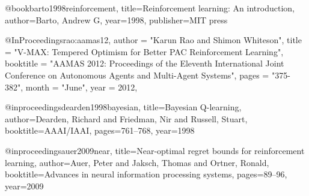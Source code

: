 @book{barto1998reinforcement,
  title={Reinforcement learning: An introduction},
  author={Barto, Andrew G},
  year={1998},
  publisher={MIT press}
}

@InProceedings{rao:aamas12,
  author        = "Karun Rao and Shimon Whiteson",
  title         = "{V-MAX}: Tempered Optimism for Better {PAC} Reinforcement Learning",
  booktitle     = "AAMAS 2012: Proceedings of the Eleventh International
                  Joint Conference on Autonomous Agents and
                  Multi-Agent Systems",
   pages = "375-382",                     
  month = "June",    
  year          = 2012,
}

@inproceedings{dearden1998bayesian,
  title={Bayesian Q-learning},
  author={Dearden, Richard and Friedman, Nir and Russell, Stuart},
  booktitle={AAAI/IAAI},
  pages={761--768},
  year={1998}
}

@inproceedings{auer2009near,
  title={Near-optimal regret bounds for reinforcement learning},
  author={Auer, Peter and Jaksch, Thomas and Ortner, Ronald},
  booktitle={Advances in neural information processing systems},
  pages={89--96},
  year={2009}
}